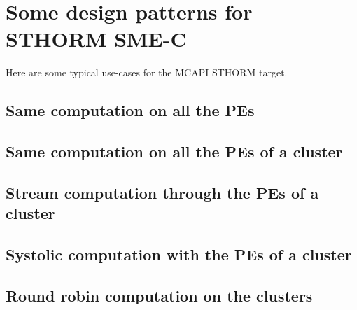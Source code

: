 \documentclass[a4paper]{article}
\begin{document}
\section{Some design patterns for STHORM SME-C}
\label{sec:examples}

Here are some typical use-cases for the MCAPI STHORM target.


\subsection{Same computation on all the PEs}
\label{sec:same-computation-all}




\subsection{Same computation on all the PEs of a cluster}
\label{sec:same-computation-all-2}




\subsection{Stream computation through the PEs of a cluster}
\label{sec:stre-comp-thro}




\subsection{Systolic computation with the PEs of a cluster}
\label{sec:syst-comp-with}




\subsection{Round robin computation on the clusters}
\label{sec:round-robin-comp}




%
\end{document}
